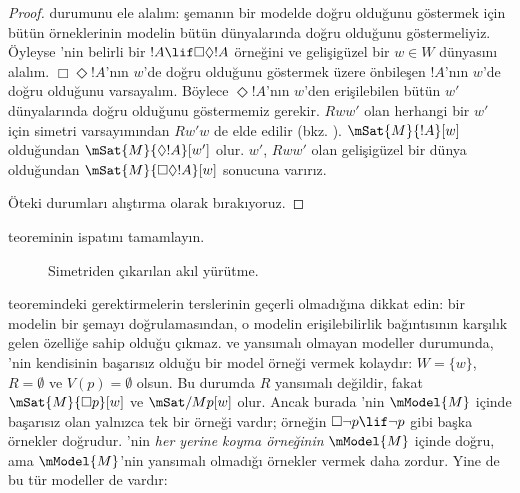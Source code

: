 \begin{proof}
   durumunu ele alalım: şemanın bir modelde doğru olduğunu göstermek
  için bütün örneklerinin modelin bütün dünyalarında doğru olduğunu
  göstermeliyiz. Öyleyse 'nin belirli bir $!A\lif\Box\Diamond !A$
  örneğini ve gelişigüzel bir $w\in W$ dünyasını alalım. $\Box\Diamond !A$'nın
  $w$'de doğru olduğunu göstermek üzere önbileşen $!A$'nın $w$'de doğru
  olduğunu varsayalım. Böylece $\Diamond !A$'nın $w$'den erişilebilen bütün
  $w'$ dünyalarında doğru olduğunu göstermemiz gerekir. $Rww'$ olan herhangi
  bir $w'$ için simetri varsayımından $Rw'w$ de elde edilir (bkz.
  ). $\mSat{M}{!A}[w]$ olduğundan
  $\mSat{M}{\Diamond !A}[w']$ olur. $w'$, $Rww'$ olan gelişigüzel bir dünya
  olduğundan $\mSat{M}{\Box\Diamond!A}[w]$ sonucuna varırız.

  Öteki durumları alıştırma olarak bırakıyoruz.
\end{proof}

\begin{prob}
   teoreminin ispatını tamamlayın.
\end{prob}

\begin{figure}
  \begin{center}
  \end{center}
\caption{Simetriden çıkarılan akıl yürütme.}
\end{figure}

 teoremindeki gerektirmelerin terslerinin geçerli
olmadığına dikkat edin: bir modelin bir şemayı doğrulamasından, o modelin
erişilebilirlik bağıntısının karşılık gelen özelliğe sahip olduğu çıkmaz.
 ve yansımalı olmayan modeller durumunda, 'nin kendisinin
başarısız olduğu bir model örneği vermek kolaydır: $W=\{w\}$,
$R=\emptyset$ ve $V(p)=\emptyset$ olsun. Bu durumda $R$ yansımalı değildir, fakat
$\mSat{M}{\Box p}[w]$ ve $\mSat/{M}{p}[w]$ olur. Ancak burada 'nin
$\mModel{M}$ içinde başarısız olan yalnızca tek bir örneği vardır; örneğin
$\Box\lnot p\lif\lnot p$ gibi başka örnekler doğrudur. 'nin
\emph{her yerine koyma örneğinin} $\mModel{M}$ içinde doğru, ama
$\mModel{M}$'nin yansımalı olmadığı örnekler vermek daha zordur. Yine de bu
tür modeller de vardır:

